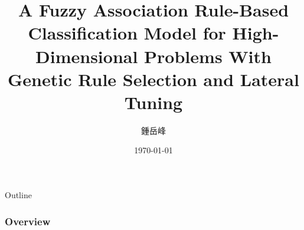 \documentclass{beamer}
\begin{document}
\begin{CJK*}{UTF8}{bsmi}


\title[A Fuzzy Association Rule-Based Classification
Model for High-Dimensional Problems With
Genetic Rule Selection and Lateral Tuning]{A Fuzzy Association Rule-Based Classification
Model for High-Dimensional Problems With
Genetic Rule Selection and Lateral Tuning} %

\author{鍾岳峰} %
\date{\today} %



\begin{frame}
\titlepage %
\end{frame}



\begin{frame}{Outline}
\frametitle{Overview} %

\tableofcontents[hideallsubsections] %
\end{frame}



\end{CJK*}
\end{document}

